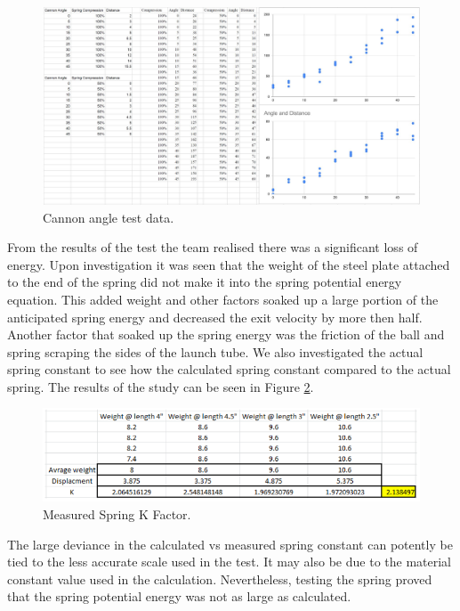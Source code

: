 \documentclass[11pt]{article}
\begin{document}
\begin{figure}[H]
    \centering
        \includegraphics[scale=.42, angle =0]{figures/cannon_prototype_angle_fireing_distance.JPG}
    \caption{Cannon angle test data.}
    \label{Cannon Angle cannon test data}
\end{figure}

From the results of the test the team realised there was a significant loss of energy. Upon investigation it was seen that the weight of the steel plate attached to the end of the spring did not make it into the spring potential energy equation. This added weight and other factors soaked up a large portion of the anticipated spring energy and decreased the exit velocity by more then half. Another factor that soaked up the spring energy was the friction of the ball and spring scraping the sides of the launch tube. We also investigated the actual spring constant to see how the calculated spring constant compared to the actual spring. The results of the study can be seen in Figure \ref{me}.

\begin{figure}[H]
    \centering
        \includegraphics[scale=.8, angle =0]{figures/mes.PNG}
    \caption{Measured Spring K Factor.}
    \label{me}
\end{figure}

The large deviance in the calculated vs measured spring constant can potently be tied to the less accurate scale used in the test. It may also be due to the material constant value used in the calculation. Nevertheless, testing the spring proved that the spring potential energy was not as large as calculated.
\end{document}
